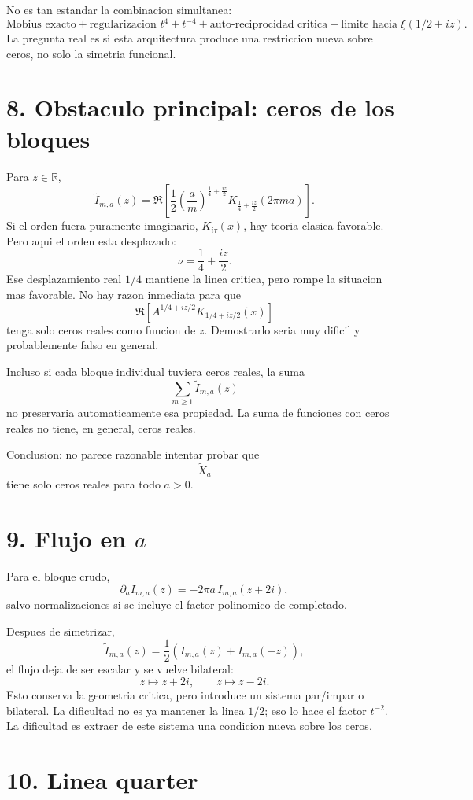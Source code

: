 \documentclass[11pt]{article}
\begin{document}
No es tan estandar la combinacion simultanea:
\[
\text{Mobius exacto}
+
\text{regularizacion }t^4+t^{-4}
+
\text{auto-reciprocidad critica}
+
\text{limite hacia }\xi(1/2+iz).
\]
La pregunta real es si esta arquitectura produce una restriccion nueva sobre
ceros, no solo la simetria funcional.

\section*{8. Obstaculo principal: ceros de los bloques}

Para \(z\in\mathbb R\),
\[
\widetilde I_{m,a}(z)
=
\Re\left[
\frac12
\left(\frac{a}{m}\right)^{\frac14+\frac{iz}{2}}
K_{\frac14+\frac{iz}{2}}(2\pi ma)
\right].
\]
Si el orden fuera puramente imaginario, \(K_{i\tau}(x)\), hay teoria clasica
favorable. Pero aqui el orden esta desplazado:
\[
\nu=\frac14+\frac{iz}{2}.
\]
Ese desplazamiento real \(1/4\) mantiene la linea critica, pero rompe la
situacion mas favorable. No hay razon inmediata para que
\[
\Re\left[A^{1/4+iz/2}K_{1/4+iz/2}(x)\right]
\]
tenga solo ceros reales como funcion de \(z\). Demostrarlo seria muy dificil
y probablemente falso en general.

Incluso si cada bloque individual tuviera ceros reales, la suma
\[
\sum_{m\ge1}\widetilde I_{m,a}(z)
\]
no preservaria automaticamente esa propiedad. La suma de funciones con ceros
reales no tiene, en general, ceros reales.

Conclusion: no parece razonable intentar probar que
\[
\widetilde X_a
\]
tiene solo ceros reales para todo \(a>0\).

\section*{9. Flujo en \(a\)}

Para el bloque crudo,
\[
\partial_a I_{m,a}(z)
=
-2\pi a\, I_{m,a}(z+2i),
\]
salvo normalizaciones si se incluye el factor polinomico de completado.

Despues de simetrizar,
\[
\widetilde I_{m,a}(z)
=\frac12(I_{m,a}(z)+I_{m,a}(-z)),
\]
el flujo deja de ser escalar y se vuelve bilateral:
\[
z\mapsto z+2i,
\qquad
z\mapsto z-2i.
\]
Esto conserva la geometria critica, pero introduce un sistema par/impar o
bilateral. La dificultad no es ya mantener la linea \(1/2\); eso lo hace el
factor \(t^{-2}\). La dificultad es extraer de este sistema una condicion
nueva sobre los ceros.

\section*{10. Linea quarter}
\end{document}
